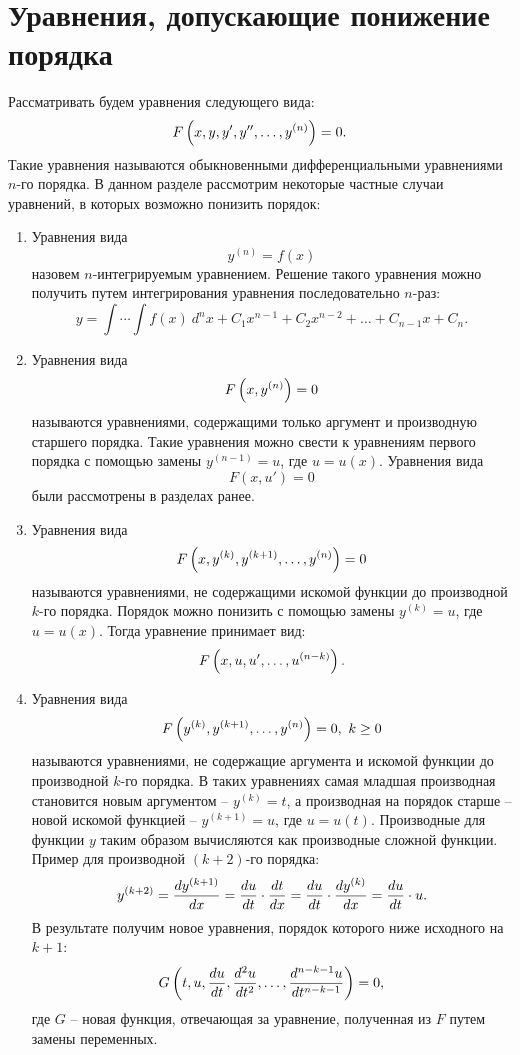 \section{Уравнения, допускающие понижение порядка}

	Рассматривать будем уравнения следующего вида:
	\[ F\left( x, y, y', y'', \dots, y^{(n)} \right) = 0. \]
	Такие уравнения называются обыкновенными дифференциальными уравнениями $n$-го порядка. В данном разделе рассмотрим некоторые частные случаи уравнений, в которых возможно понизить порядок:
	\begin{enumerate}
		\item Уравнения вида
			\[ y^{(n)} = f(x) \]
			назовем $n$-интегрируемым уравнением. Решение такого уравнения можно получить путем интегрирования уравнения последовательно $n$-раз:
			\[ y = \int \cdots \int f(x) ~ d^n x + C_1 x^{n-1} + C_2 x^{n-2} + \dots + C_{n-1} x + C_n. \]

		\item Уравнения вида
			\[ F\left( x, y^{(n)} \right) = 0 \]
			называются уравнениями, содержащими только аргумент и производную старшего порядка. Такие уравнения можно свести к уравнениям первого порядка с помощью замены $y^{(n-1)} = u$, где $u = u(x)$. Уравнения вида 
			\[ F(x, u') = 0 \] 
			были рассмотрены в разделах ранее.

		\item Уравнения вида
			\[ F\left( x, y^{(k)}, y^{(k+1)}, \dots, y^{(n)} \right) = 0 \]
			называются уравнениями, не содержащими искомой функции до производной $k$-го порядка. Порядок можно понизить с помощью замены $y^{(k)} = u$, где $u = u(x)$. Тогда уравнение принимает вид:
			\[ F\left( x, u, u', \dots, u^{(n-k)} \right). \]

		\item Уравнения вида
			\[ F\left( y^{(k)}, y^{(k+1)}, \dots, y^{(n)} \right) = 0, ~ k \ge 0 \]
			называются уравнениями, не содержащие аргумента и искомой функции до производной $k$-го порядка. В таких уравнениях самая младшая производная становится новым аргументом -- $y^{(k)} = t$, а производная на порядок старше -- новой искомой функцией -- $y^{(k+1)} = u$, где $u = u(t)$. Производные для функции $y$ таким образом вычисляются как производные сложной функции. Пример для производной $(k+2)$-го порядка:
			\[ y^{(k+2)} = \dfrac{d y^{(k+1)}}{d x} = \dfrac{d u}{d t} \cdot \dfrac{d t}{d x} = \dfrac{d u}{d t} \cdot \dfrac{d y^{(k)}}{d x} = \dfrac{d u}{d t} \cdot u. \]
			В результате получим новое уравнения, порядок которого ниже исходного на $k+1$:
			\[ G\left( t, u, \dfrac{d u}{d t}, \dfrac{d^{2} u}{d t^{2}}, \dots, \dfrac{d^{n-k-1} u}{d t^{n-k-1}} \right) = 0, \]
			где $G$ -- новая функция, отвечающая за уравнение, полученная из $F$ путем замены переменных.


\end{enumerate}
